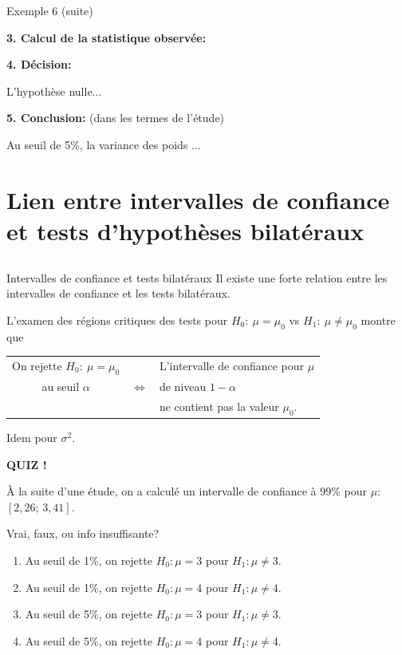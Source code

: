 \documentclass{BeamerTemplate}
\begin{document}
\begin{frame}[t]{Exemple 6 (suite)}

{\bf 3. Calcul de la statistique observée:}

\vfill
{\bf 4. Décision:}

L'hypothèse nulle...

\bigskip
{\bf 5. Conclusion:} (dans les termes de l'étude)

Au seuil de 5\%, la variance des poids ...
\bigskip
\end{frame}


\section[Lien IC]{Lien entre intervalles de confiance et tests d'hypothèses bilatéraux}
\subsection*{ }

\begin{frame}[t]{Intervalles de confiance et tests bilatéraux}
Il existe une forte relation entre les intervalles de confiance et les  tests  bilatéraux.

\bigskip
L'examen des régions critiques des tests pour
 $H_0:~\mu=\mu_0$ vs $H_1:~\mu\neq\mu_0$ montre que
 \bigskip

 \begin{tabular}{c c l}
 \alert{On rejette $H_0:~\mu=\mu_0$ }&  &
 \alert{L'intervalle de confiance pour $\mu$ }\\
 \alert{au seuil $\alpha$}& $\Leftrightarrow$ &\alert{de niveau $1-\alpha$ }\\
 &&\alert{ne
 contient pas la valeur $\mu_0$}.
 \end{tabular}

 \vspace{1.8cm}

 Idem pour $\sigma^2$.
\end{frame}

\begin{frame}[t]{ }

\centerline{\LARGE\bf \alert{QUIZ !}}
\bigskip

À la suite d'une étude, on a calculé un intervalle de confiance à 99\% pour $\mu$: $[2,26;\,3,41]$.

\bigskip
Vrai, faux, ou info insuffisante?

\begin{enumerate}\itemsep 8mm
\item Au seuil de 1\%, on rejette $H_0:\mu=3$ pour $H_1:\mu\ne3$.
\item Au seuil de 1\%, on rejette $H_0:\mu=4$ pour $H_1:\mu\ne4$.
\item Au seuil de 5\%, on rejette $H_0:\mu=3$ pour $H_1:\mu\ne3$.
\item Au seuil de 5\%, on rejette $H_0:\mu=4$ pour $H_1:\mu\ne4$.
\end{enumerate}


\end{frame}
\end{document}
